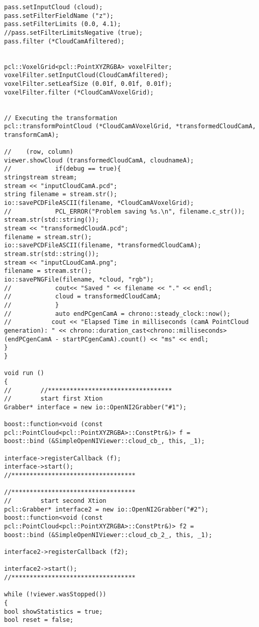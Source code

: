 \begin{lstlisting}[frame = single, label={lst:cppread1}]
pass.setInputCloud (cloud);
pass.setFilterFieldName ("z");
pass.setFilterLimits (0.0, 4.1);
//pass.setFilterLimitsNegative (true);
pass.filter (*CloudCamAfiltered);


pcl::VoxelGrid<pcl::PointXYZRGBA> voxelFilter;
voxelFilter.setInputCloud(CloudCamAfiltered);
voxelFilter.setLeafSize (0.01f, 0.01f, 0.01f);
voxelFilter.filter (*CloudCamAVoxelGrid);


// Executing the transformation
pcl::transformPointCloud (*CloudCamAVoxelGrid, *transformedCloudCamA, transformCamA);

//    (row, column)
viewer.showCloud (transformedCloudCamA, cloudnameA);
//            if(debug == true){
stringstream stream;
stream << "inputCloudCamA.pcd";
string filename = stream.str();
io::savePCDFileASCII(filename, *CloudCamAVoxelGrid);
//            PCL_ERROR("Problem saving %s.\n", filename.c_str());
stream.str(std::string());
stream << "transformedCloudA.pcd";
filename = stream.str();
io::savePCDFileASCII(filename, *transformedCloudCamA);
stream.str(std::string());
stream << "inputCLoudCamA.png";
filename = stream.str();
io::savePNGFile(filename, *cloud, "rgb");
//            cout<< "Saved " << filename << "." << endl;
//            cloud = transformedCloudCamA;
//            }
//            auto endPCgenCamA = chrono::steady_clock::now();
//           cout << "Elapsed Time in milliseconds (camA PointCloud generation): " << chrono::duration_cast<chrono::milliseconds>(endPCgenCamA - startPCgenCamA).count() << "ms" << endl;
}
}

void run ()
{
//        //**********************************
//        start first Xtion
Grabber* interface = new io::OpenNI2Grabber("#1");

boost::function<void (const pcl::PointCloud<pcl::PointXYZRGBA>::ConstPtr&)> f =
boost::bind (&SimpleOpenNIViewer::cloud_cb_, this, _1);

interface->registerCallback (f);
interface->start();
//**********************************

//**********************************
//        start second Xtion
pcl::Grabber* interface2 = new io::OpenNI2Grabber("#2");
boost::function<void (const pcl::PointCloud<pcl::PointXYZRGBA>::ConstPtr&)> f2 =
boost::bind (&SimpleOpenNIViewer::cloud_cb_2_, this, _1);

interface2->registerCallback (f2);

interface2->start();
//**********************************

while (!viewer.wasStopped())
{
bool showStatistics = true;
bool reset = false;


\end{lstlisting}

